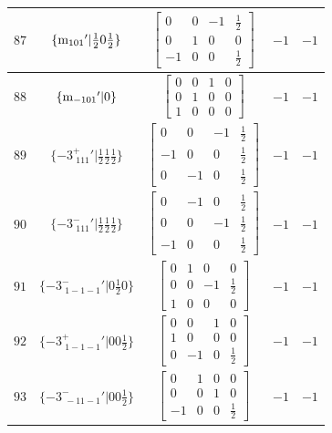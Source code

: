 \documentclass[fleqn,8pt]{jsarticle}
\begin{document}
\begin{longtable}{ccccc}
$ 87 $ & $ \{{\rm m}_{101}{}'|\frac{1}{2} 0 \frac{1}{2}\} $ & $ \begin{bmatrix} 0 & 0 & -1 & \frac{1}{2} \\ 0 & 1 & 0 & 0 \\ -1 & 0 & 0 & \frac{1}{2} \end{bmatrix} $ & $ -1 $ & $ -1 $ \\ \hline
$ 88 $ & $ \{{\rm m}_{-101}{}'|0\} $ & $ \begin{bmatrix} 0 & 0 & 1 & 0 \\ 0 & 1 & 0 & 0 \\ 1 & 0 & 0 & 0 \end{bmatrix} $ & $ -1 $ & $ -1 $ \\ \hline
$ 89 $ & $ \{-3^{+}_{\,\,111}{}'|\frac{1}{2} \frac{1}{2} \frac{1}{2}\} $ & $ \begin{bmatrix} 0 & 0 & -1 & \frac{1}{2} \\ -1 & 0 & 0 & \frac{1}{2} \\ 0 & -1 & 0 & \frac{1}{2} \end{bmatrix} $ & $ -1 $ & $ -1 $ \\ \hline
$ 90 $ & $ \{-3^{-}_{\,\,111}{}'|\frac{1}{2} \frac{1}{2} \frac{1}{2}\} $ & $ \begin{bmatrix} 0 & -1 & 0 & \frac{1}{2} \\ 0 & 0 & -1 & \frac{1}{2} \\ -1 & 0 & 0 & \frac{1}{2} \end{bmatrix} $ & $ -1 $ & $ -1 $ \\ \hline
$ 91 $ & $ \{-3^{-}_{\,\,1-1-1}{}'|0 \frac{1}{2} 0\} $ & $ \begin{bmatrix} 0 & 1 & 0 & 0 \\ 0 & 0 & -1 & \frac{1}{2} \\ 1 & 0 & 0 & 0 \end{bmatrix} $ & $ -1 $ & $ -1 $ \\ \hline
$ 92 $ & $ \{-3^{+}_{\,\,1-1-1}{}'|0 0 \frac{1}{2}\} $ & $ \begin{bmatrix} 0 & 0 & 1 & 0 \\ 1 & 0 & 0 & 0 \\ 0 & -1 & 0 & \frac{1}{2} \end{bmatrix} $ & $ -1 $ & $ -1 $ \\ \hline
$ 93 $ & $ \{-3^{-}_{\,\,-11-1}{}'|0 0 \frac{1}{2}\} $ & $ \begin{bmatrix} 0 & 1 & 0 & 0 \\ 0 & 0 & 1 & 0 \\ -1 & 0 & 0 & \frac{1}{2} \end{bmatrix} $ & $ -1 $ & $ -1 $ \\ \hline

\end{longtable}
\end{document}
